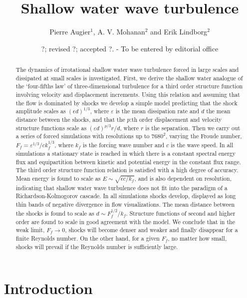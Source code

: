 \documentclass{jfm}
\title[Shallow water wave turbulence]%
{ Shallow water wave turbulence}
\author[P. Augier, A.V. Mohanan and E. Lindborg]%
{Pierre Augier$^{1}$,   A. V. Mohanan$^{2}$ 
and Erik Lindborg$^2$ \ns }
\affiliation{$^2$ KTH Mechanics,
SE-100 44 Stockholm, Sweden\\[\affilskip]
$^1$ LEGI, BP53,
38041 Grenoble Cedex, France}
\date{?; revised ?; accepted ?. - To be entered by editorial office}
\newcommand{\eps}{\varepsilon}
\begin{document}
\maketitle


\begin{abstract}
The dynamics of irrotational shallow water wave turbulence forced in large scales
and dissipated  at small scales is investigated.
First, we derive the shallow water analogue of the `four-fifths law' of three-dimensional turbulence for a third order structure function involving velocity and displacement increments.
Using this relation and assuming that the flow is dominated by shocks we develop a simple model predicting that the shock amplitude scales as $ (\epsilon d)^{1/3} $, where $ \eps $ is the mean dissipation rate and $ d $ the mean distance between the shocks, and that the
$ p $:th order displacement and velocity structure functions scale as
$ (\eps d)^{p/3} r/d $, where $ r $ is the separation. 
Then we carry out a series of forced simulations with resolutions up to $7680^2$, varying the Froude number,  $F_{f} = \eps^{1/3}  / ck_f^{1/3} $, where $ k_f $  is the forcing wave number and $c$ is the wave speed.
In all simulations a stationary state is reached  in which there is a constant spectral energy flux and equipartition between kinetic and potential energy in the constant flux range. The third order structure function relation is satisfied with a high degree of accuracy. 
Mean energy is found to scale as $ E \sim \sqrt{\epsilon c/k_f} $,  and is also dependent on resolution, indicating that shallow water wave turbulence does not fit into the paradigm of a Richardson-Kolmogorov cascade.  
In all simulations shocks develop, displayed as long thin bands of negative divergence in flow visualizations. The mean distance between the shocks is found to scale  as $ d \sim F_f^{1/2}/k_f $. Structure functions of second and higher order are found to scale in good agreement with the model. We conclude that in the weak limit, $ F_f \rightarrow 0 $, shocks will become denser and weaker and finally disappear for a finite Reynolds number. On the other hand, for a given $ F_{f} $, no matter how small, shocks will prevail if the Reynolds number is sufficiently large. 
 

\end{abstract}


\section{Introduction}
\end{document}
